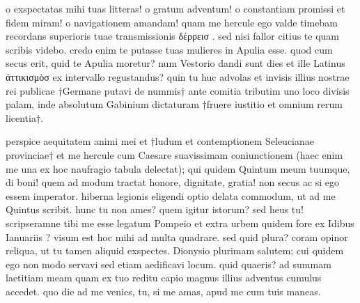 


 o exspectatas mihi tuas litteras! o gratum adventum! o constantiam promissi et fidem miram! o navigationem amandam! quam me hercule ego valde timebam recordans superioris tuae transmissionis δέρρεισ . sed nisi fallor citius te quam scribis videbo. credo enim te putasse tuas mulieres in Apulia esse. quod cum secus erit, quid te Apulia moretur? num Vestorio dandi sunt dies et ille Latinus ἀττικισμὸσ ex intervallo regustandus? quin tu huc advolas et invisis illius nostrae rei publicae †Germane putavi de nummis† ante comitia tributim uno loco divisis palam, inde absolutum Gabinium dictaturam †fruere iustitio et omnium rerum licentia†.

 perspice aequitatem animi mei et †ludum et contemptionem Seleucianae provinciae† et me hercule cum Caesare suavissimam coniunctionem (haec enim me una ex hoc naufragio tabula delectat); qui quidem Quintum meum tuumque, di boni! quem ad modum tractat honore, dignitate, gratia! non secus ac si ego essem imperator. hiberna legionis eligendi optio delata commodum, ut ad me Quintus scribit. hunc tu non ames? quem igitur istorum? sed heus tu! scripseramne tibi me esse legatum Pompeio et extra urbem quidem fore ex Idibus Ianuariis ? visum est hoc mihi ad multa quadrare. sed quid plura? coram opinor reliqua, ut tu tamen aliquid exspectes. Dionysio plurimam salutem; cui quidem ego non modo servavi sed etiam aedificavi locum. quid quaeris? ad summam laetitiam meam quam ex tuo reditu capio magnus illius adventus cumulus accedet. quo die ad me venies, tu, si me amas, apud me cum tuis maneas.
